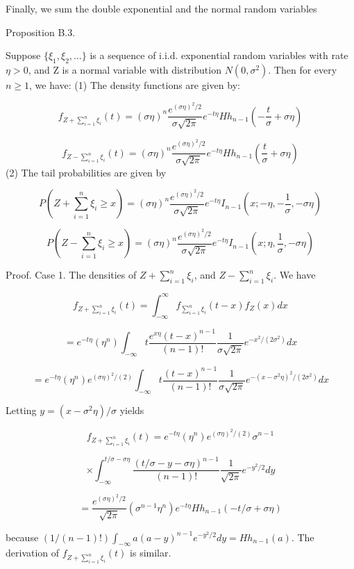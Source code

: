 Finally, we sum the double exponential and the normal random variables

Proposition B.3.

Suppose $\{\xi_{1},\xi_{2},...\}$ is a sequence of i.i.d. exponential random variables with rate $\eta>0$, and Z is a normal variable with distribution $N(0,\sigma^{2})$. Then for every $ n \geq 1$, we have: (1) The density functions are given by:

$$f_{Z+\sum_{i=1}^{n}\xi_{i}}(t)=(\sigma\eta)^{n}\frac{e^{(\sigma\eta)^{2}/2}}{\sigma\sqrt{2\pi}}e^{-t\eta}Hh_{n-1}(-\frac{t}{\sigma}+\sigma\eta)$$

$$f_{Z-\sum_{i=1}^{n}\xi_{i}}(t)=(\sigma\eta)^{n}\frac{e^{(\sigma\eta)^{2}/2}}{\sigma\sqrt{2\pi}}e^{-t\eta}Hh_{n-1}(\frac{t}{\sigma}+\sigma\eta)$$
(2) The tail probabilities are given by

$$P(Z+\sum_{i=1}^{n}\xi_{i}\geq x) = (\sigma\eta)^{n}\frac{e^{(\sigma\eta)^{2}/2}}{\sigma\sqrt{2\pi}}e^{-t\eta}I_{n-1}(x;-\eta,-\frac{1}{\sigma},-\sigma\eta)$$

$$P(Z-\sum_{i=1}^{n}\xi_{i}\geq x) = (\sigma\eta)^{n}\frac{e^{(\sigma\eta)^{2}/2}}{\sigma\sqrt{2\pi}}e^{-t\eta}I_{n-1}(x;\eta,\frac{1}{\sigma},-\sigma\eta)$$

Proof. Case 1. The densities of $Z+\sum_{i=1}^{n}\xi_{i}$, and $Z-\sum_{i=1}^{n}\xi_{i}$. We have

$$f_{Z+\sum_{i=1}^{n}\xi_{i}}(t)=\int_{-\infty}^{\infty}f_{\sum_{i=1}^{n}\xi_{i}}(t-x)f_{Z}(x)dx$$

$$=e^{-t\eta}(\eta^{n})\int_{-\infty}{t}\frac{e^{x\eta}(t-x)^{n-1}}{(n-1)!}\frac{1}{\sigma\sqrt{2\pi}}e^{-x^{2}/(2\sigma^{2})}dx$$

$$=e^{-t\eta}(\eta^{n})e^{(\sigma\eta)^{2}/(2)}\int_{-\infty}{t}\frac{(t-x)^{n-1}}{(n-1)!}\frac{1}{\sigma\sqrt{2\pi}}e^{-(x-\sigma^{2}\eta)^{2}/(2\sigma^{2})}dx$$

Letting $y=(x-\sigma^{2}\eta)/\sigma$ yields

$$f_{Z+\sum_{i=1}^{n}\xi_{i}}(t)=e^{-t\eta}(\eta^{n})e^{(\sigma\eta)^{2}/(2)}\sigma^{n-1}$$

$$\times\int_{-\infty}^{t/\sigma-\sigma\eta}\frac{(t/\sigma - y -\sigma\eta)^{n-1}}{(n-1)!}\frac{1}{\sqrt{2\pi}}e^{-y^{2}/2}dy$$

$$=\frac{e^{(\sigma\eta)^{2}/2}}{\sqrt{2\pi}}(\sigma^{n-1}\eta^{n})e^{-t\eta}Hh_{n-1}(-t/\sigma + \sigma\eta)$$

because $(1/(n-1)!)\int_{-\infty}{a}(a-y)^{n-1}e^{-y^{2}/2}dy=Hh_{n-1}(a)$. The derivation of $f_{Z+\sum_{i=1}^{n}\xi_{i}}(t)$ is similar.

